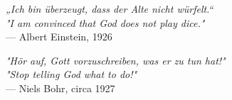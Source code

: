 \begin{flushright}
\emph{„Ich bin überzeugt, dass der Alte nicht würfelt.“}\\
\emph{"I am convinced that God does not play dice."}\\
— Albert Einstein, 1926
\end{flushright}

\vspace{2em}

\begin{flushright}
\emph{"Hör auf, Gott vorzuschreiben, was er zu tun hat!"}\\
\emph{"Stop telling God what to do!"}\\
— Niels Bohr, circa 1927
\end{flushright}
